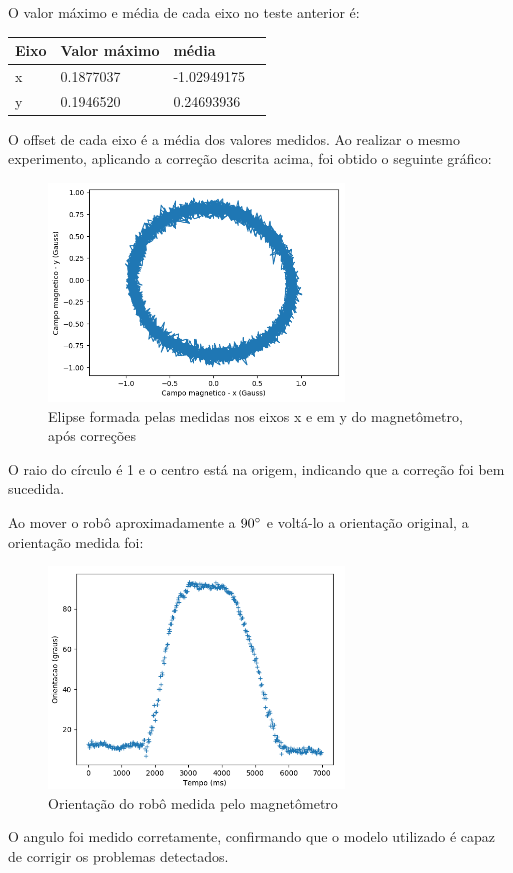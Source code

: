 \documentclass[
	12pt,				%
	openright,			%
	twoside,			%
	convert,
	a4paper,			%
	english,			%
	french,				%
	spanish,			%
	brazil				%
	]{abntex2}
\begin{document}
\par
O valor máximo e média de cada eixo no teste anterior é:
\begin{center}
\begin{tabular}{ | l | l | l | p{5cm} |}
    \hline
    Eixo & Valor máximo & média \\ \hline
    x & 0.1877037 & -1.02949175 \\ \hline
    y & 0.1946520 & 0.24693936 \\
    \hline
\end{tabular}
\end{center}
O offset de cada eixo é a média dos valores medidos. Ao realizar o mesmo experimento, aplicando a correção descrita acima, foi obtido o seguinte gráfico:
\begin{figure}[H]
	\caption{Elipse formada pelas medidas nos eixos x e em y do magnetômetro, após correções}
\begin{center}
   \includegraphics[width=0.7\textwidth]{mag_x_y_fix}
\end{center}
\end{figure}
O raio do círculo é 1 e o centro está na origem, indicando que a correção foi bem sucedida.
\par
Ao mover o robô aproximadamente a $90\degree$ e voltá-lo a orientação original, a orientação medida foi:
\begin{figure}[H]
	\caption{Orientação do robô medida pelo magnetômetro}
\begin{center}
   \includegraphics[width=0.7\textwidth]{mag_90_teste}
\end{center}
\end{figure}
O angulo foi medido corretamente, confirmando que o modelo utilizado é capaz de corrigir os problemas detectados.
\end{document}
